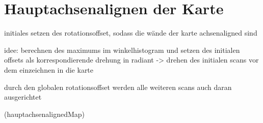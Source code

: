 \section{Hauptachsenalignen der Karte}

initiales setzen des rotationsoffset, sodass die wände der karte achsenaligned sind

idee: berechnen des maximums im winkelhistogram und setzen des initialen offsets als korrespondierende drehung in radiant -> drehen des initialen scans vor dem einzeichnen in die karte

durch den globalen rotationsoffset werden alle weiteren scans auch daran ausgerichtet

(hauptachsenalignedMap)